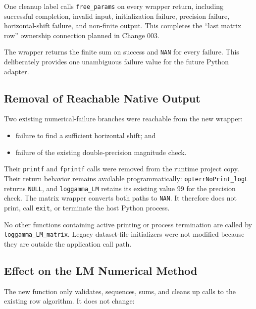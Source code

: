 \documentclass[11pt,a4paper]{article}
\begin{document}
One cleanup label calls \texttt{free\_params} on every wrapper return, including
successful completion, invalid input, initialization failure, precision
failure, horizontal-shift failure, and non-finite output. This completes the
``last matrix row'' ownership connection planned in Change 003.

The wrapper returns the finite sum on success and \texttt{NAN} for every
failure. This deliberately provides one unambiguous failure value for the
future Python adapter.

\subsection{Removal of Reachable Native Output}

Two existing numerical-failure branches were reachable from the new wrapper:

\begin{itemize}

\item failure to find a sufficient horizontal shift; and

\item failure of the existing double-precision magnitude check.

\end{itemize}

Their \texttt{printf} and \texttt{fprintf} calls were removed from the runtime
project copy. Their return behavior remains available programmatically:
\texttt{opterrNoPrint\_logL} returns \texttt{NULL}, and
\texttt{loggamma\_LM} retains its existing value 99 for the precision check.
The matrix wrapper converts both paths to \texttt{NAN}. It therefore does not
print, call \texttt{exit}, or terminate the host Python process.

No other functions containing active printing or process termination are
called by \texttt{loggamma\_LM\_matrix}. Legacy dataset-file initializers were
not modified because they are outside the application call path.

\subsection{Effect on the LM Numerical Method}

The new function only validates, sequences, sums, and cleans up calls to the
existing row algorithm. It does not change:
\end{document}

